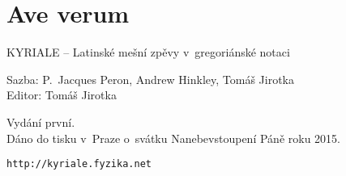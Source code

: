 \documentclass[12pt]{article} %
\begin{document}
\section{Ave verum}




\newpage
\tableofcontents




\newpage
\thispagestyle{empty}
\mbox{}

\newpage
\thispagestyle{empty}
\mbox{}

\begin{centering}
\setlength{\parskip}{1em}
\vspace{16cm}

	KYRIALE -- Latinské mešní zpěvy v~gregoriánské notaci

	Sazba: P.~Jacques Peron, Andrew Hinkley, Tomáš Jirotka\\
	Editor: Tomáš Jirotka

	Vydání první.\\
	Dáno do tisku v~Praze o~svátku Nanebevstoupení Páně roku 2015.

	{\tt http://kyriale.fyzika.net}

\end{centering}
\end{document}
